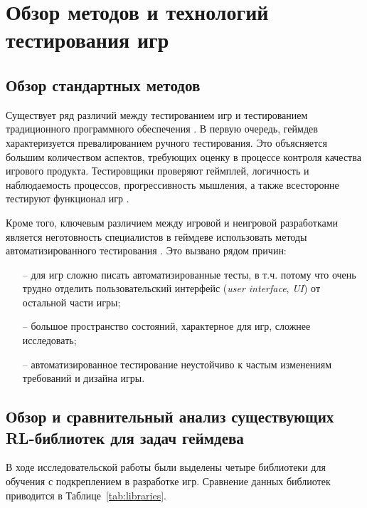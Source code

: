 \section{Обзор методов и технологий тестирования игр}

\subsection{Обзор стандартных методов}
Существует ряд различий между тестированием игр и тестированием традиционного программного обеспечения \cite{santos2018computer}. В первую очередь, геймдев характеризуется превалированием ручного тестирования. Это объясняется большим количеством аспектов, требующих оценку в процессе контроля качества игрового продукта. Тестировщики проверяют геймплей, логичность и наблюдаемость процессов, прогрессивность мышления, а также всесторонне тестируют функционал игр \cite{aleem2016critical}. 

Кроме того, ключевым различием между игровой и неигровой разработками является неготовность специалистов в геймдеве использовать методы автоматизированного тестирования \cite{murphy2014cowboys}. Это вызвано рядом причин:
\begin{itemize}
	\item[--] для игр сложно писать автоматизированные тесты, в т.ч. потому что очень трудно отделить пользовательский интерфейс (\textit{user interface}, \textit{UI}) от остальной части игры;
	\item[--] большое пространство состояний, характерное для игр, сложнее исследовать;
	\item[--] автоматизированное тестирование неустойчиво к частым изменениям требований и дизайна игры.
\end{itemize}

\subsection{Обзор и сравнительный анализ существующих RL-библиотек для задач геймдева}
В ходе исследовательской работы были выделены четыре библиотеки для обучения с подкреплением в разработке игр. Сравнение данных библиотек приводится в Таблице~\ref{tab:libraries}.

